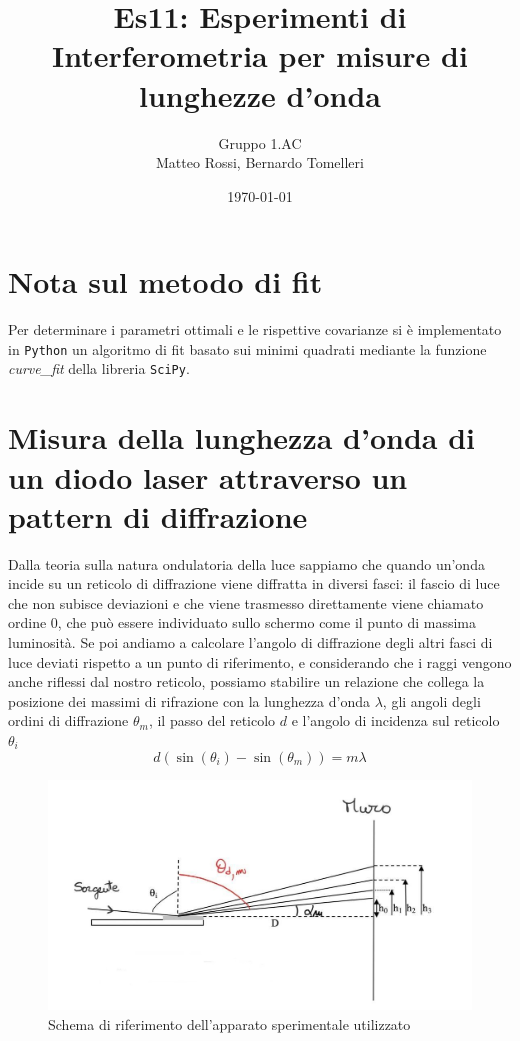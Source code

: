 \documentclass[10pt, a4paper, italian]{article}
\author{Gruppo 1.AC \\ Matteo Rossi, Bernardo Tomelleri}
\title{Es11: Esperimenti di Interferometria per misure di lunghezze d'onda}
\begin{document}
\date{\today}
\maketitle

\setcounter{section}{0}

\section*{Nota sul metodo di fit}
Per determinare i parametri ottimali e le rispettive covarianze si \`e
implementato in \verb+Python+ un algoritmo di fit basato sui minimi quadrati
mediante la funzione \emph{curve\_fit} della libreria \texttt{SciPy}.

\section{Misura della lunghezza d'onda di un diodo laser attraverso un pattern di diffrazione}
Dalla teoria sulla natura ondulatoria della luce sappiamo che quando un'onda incide su un reticolo di diffrazione viene diffratta in diversi fasci: il fascio di luce che non subisce deviazioni e che viene trasmesso direttamente viene chiamato ordine 0, che può essere individuato sullo schermo come il punto di massima luminosità. Se poi andiamo a calcolare l'angolo di diffrazione degli altri fasci di luce deviati rispetto a un punto di riferimento, e considerando che i raggi vengono anche riflessi dal nostro reticolo, possiamo stabilire un relazione che collega la posizione dei massimi di rifrazione con la lunghezza d'onda $\lambda$, gli angoli degli ordini di diffrazione $\theta _m$, il passo del reticolo $d$ e l'angolo di incidenza sul reticolo $\theta _i$
\begin{equation}
d(\sin(\theta _i) - \sin(\theta _m))=m \lambda
\label{eq:diff}
\end{equation}
\begin{figure}
\includegraphics[width=\textwidth]{0}
\caption{ \label{schema1} Schema di riferimento dell'apparato sperimentale utilizzato}
\end{figure}
\end{document}
